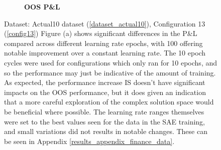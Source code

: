 \documentclass[a4paper,11pt,oneside]{article}
\theoremstyle{plain}
\theoremstyle{definition}
\begin{document}
\begin{figure}[H]
\begin{subfigure}{.5\textwidth}
			\caption{\textbf{OOS P\&L} 
				\newline }
			\label{figure-actual_oos_pl_lr_epochs}
		\end{subfigure}
		\caption[Effects of Epoch Cycle Lengths on P\&L]
		{Dataset: Actual10 dataset (\ref{dataset_actual10}), Configuration 13 (\ref{config13})
		\newline Figure (a) shows significant differences in the P\&L compared across different learning rate epochs, with 100 offering notable improvement over  a constant learning rate. The 10 epoch cycles were used for configurations which only ran for 10 epochs, and so the performance may just be indicative of the amount of training. As expected, the performance increase IS doesn't have significant impacts on the OOS performance, but it does given an indication that a more careful exploration of the complex solution space would be beneficial where possible.
		\newline\newline
		The learning rate ranges themselves were set to the best values seen for the data in the SAE training, and small variations did not results in notable changes. These can be seen in Appendix \ref{results_appendix_finance_data}.}
		\label{figure-actual_pl_lr_epochs}
	\end{figure}
	
\end{document}
